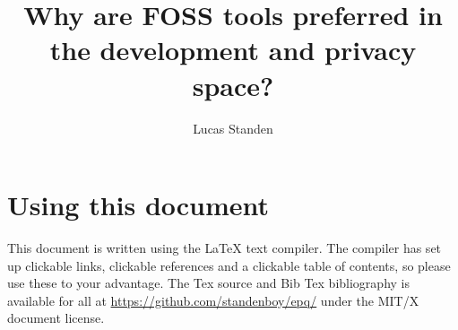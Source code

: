 \documentclass[a4paper,12pt]{article}
\author{Lucas Standen} \title{Why are FOSS tools preferred in the development and privacy space?}
\begin{document}
 \maketitle

\newpage

\section{Using this document} This document is written using the {\LaTeX} text compiler. The compiler has set up
clickable links, clickable references and a clickable table of contents, so please use these to your advantage.
The Tex source and Bib Tex bibliography is available for all at \url{https://github.com/standenboy/epq/} under
the MIT/X document license.

\tableofcontents \newpage

\setlength{\parskip}{1em}
\end{document}
